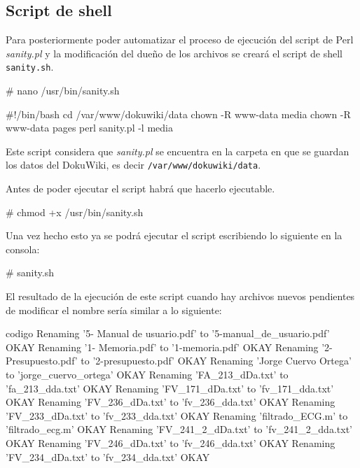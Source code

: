 \subsection{Script de shell}

Para posteriormente poder automatizar el proceso de ejecución del script de Perl \textit{sanity.pl} y la modificación del dueño de los archivos se creará el script de shell \texttt{sanity.sh}.

\begin{listing}[style=consola, numbers=none]
 # nano /usr/bin/sanity.sh
\end{listing}

\begin{listing}
#!/bin/bash
cd /var/www/dokuwiki/data 
chown -R www-data media
chown -R www-data pages
perl sanity.pl -l media
\end{listing}

Este script considera que \textit{sanity.pl} se encuentra en la carpeta en que se guardan los datos del DokuWiki, es decir \texttt{/var/www/dokuwiki/data}.

Antes de poder ejecutar el script habrá que hacerlo ejecutable.

\begin{listing}[style=consola, numbers=none]
 # chmod +x /usr/bin/sanity.sh
\end{listing}

Una vez hecho esto ya se podrá ejecutar el script escribiendo lo siguiente en la consola:

\begin{listing}[style=consola, numbers=none]
# sanity.sh
\end{listing}

El resultado de la ejecución de este script cuando hay archivos nuevos pendientes de modificar el nombre sería similar a lo siguiente:

\begin{SaveVerbatim}{codigo}
Renaming '5- Manual de usuario.pdf' to '5-manual_de_usuario.pdf'        OKAY
Renaming '1- Memoria.pdf' to '1-memoria.pdf'    OKAY
Renaming '2- Presupuesto.pdf' to '2-presupuesto.pdf'    OKAY
Renaming 'Jorge Cuervo Ortega' to 'jorge_cuervo_ortega' OKAY
Renaming 'FA_213_dDa.txt' to 'fa_213_dda.txt'   OKAY
Renaming 'FV_171_dDa.txt' to 'fv_171_dda.txt'   OKAY
Renaming 'FV_236_dDa.txt' to 'fv_236_dda.txt'   OKAY
Renaming 'FV_233_dDa.txt' to 'fv_233_dda.txt'   OKAY
Renaming 'filtrado_ECG.m' to 'filtrado_ecg.m'   OKAY
Renaming 'FV_241_2_dDa.txt' to 'fv_241_2_dda.txt'       OKAY
Renaming 'FV_246_dDa.txt' to 'fv_246_dda.txt'   OKAY
Renaming 'FV_234_dDa.txt' to 'fv_234_dda.txt'   OKAY
\end{SaveVerbatim}

